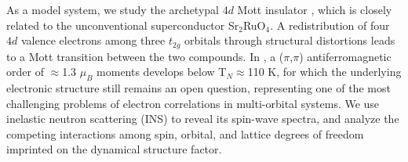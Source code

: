 As a model system, we study the archetypal 4$d$ Mott insulator \CROns, which is closely related to the unconventional superconductor Sr$_2$RuO$_4$. A redistribution of four $4d$ valence electrons among three $t_{2g}$ orbitals through structural distortions leads to a Mott transition between the two compounds. In \CROns, a ($\pi$,$\pi$) antiferromagnetic order of $\approx$1.3 $\mu_B$ moments develops below T$_N$$\approx$110 K, for which the underlying electronic structure still remains an open question, representing one of the most challenging problems of electron correlations in multi-orbital systems. We use  inelastic neutron scattering (INS) to reveal its spin-wave spectra, and analyze the competing interactions among spin, orbital, and lattice degrees of freedom imprinted on the dynamical structure factor.